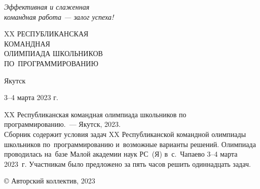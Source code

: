 \documentclass[a5paper, twoside, 11pt]{article}
\begin{document}
\pagestyle{empty}

\begin{flushright}
\hfill
\it
Эффективная и слаженная\\
командная работа --- залог успеха!
\end{flushright}
\vskip5cm

\begin{center}
\huge
XX РЕСПУБЛИКАНСКАЯ \\КОМАНДНАЯ\\ОЛИМПИАДА ШКОЛЬНИКОВ \\
ПО~ПРОГРАММИРОВАНИЮ
\end{center}

\vfill
\centerline{Якутск}
\centerline{3--4 марта 2023 г.}
\newpage
\noindent XX Республиканская командная олимпиада школьников по программированию.~--- Якутск, 2023.
\\[5mm]
Сборник содержит условия задач XX Республиканской командной олимпиады школьников по~программированию 
и~возможные варианты решений. Олимпиада проводилась на~базе Малой академии наук РС~(Я) в~с.~Чапаево
3--4 марта 2023~г. Участникам было предложено за пять часов решить одиннадцать задач.
\vfill

{}\hfill © Авторский коллектив, 2023
\end{document}
